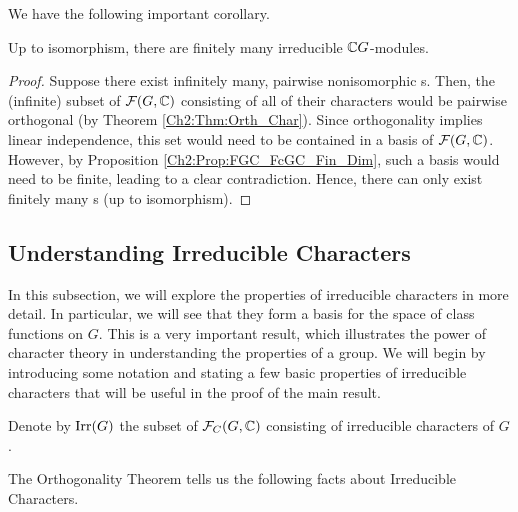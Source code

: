 We have the following important corollary.

\begin{corollary}\label{Ch2:Cor:Fin_Irred_Char}
    Up to isomorphism, there are finitely many irreducible $\mathbb{C} G$-modules.
\end{corollary}
\begin{proof}
    Suppose there exist infinitely many, pairwise nonisomorphic \CGM s. Then, the (infinite) subset of $\mathcal{F}\!\left( G, \mathbb{C} \right)$ consisting of all of their characters would be pairwise orthogonal (by Theorem \ref{Ch2:Thm:Orth_Char}). Since orthogonality implies linear independence, this set would need to be contained in a basis of $\mathcal{F}\!\left( G, \mathbb{C} \right)$. However, by Proposition \ref{Ch2:Prop:FGC_FcGC_Fin_Dim}, such a basis would need to be finite, leading to a clear contradiction. Hence, there can only exist finitely many \CGM s (up to isomorphism).
\end{proof}

\subsection{Understanding Irreducible Characters}

In this subsection, we will explore the properties of irreducible characters in more detail. In particular, we will see that they form a basis for the space of class functions on $G$. This is a very important result, which illustrates the power of character theory in understanding the properties of a group. We will begin by introducing some notation and stating a few basic properties of irreducible characters that will be useful in the proof of the main result.

\begin{boxnotation}
    Denote by $\operatorname{Irr}\!\left( G \right)$ the subset of $\mathcal{F}_C\!\left( G, \mathbb{C} \right)$ consisting of irreducible characters of $G$.
\end{boxnotation}

The Orthogonality Theorem tells us the following facts about Irreducible Characters.

